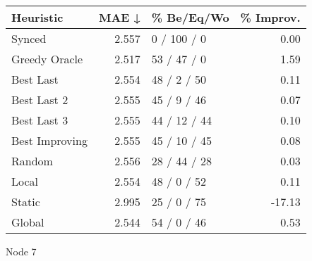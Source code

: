 \begin{tabular}{lrlr}
\toprule
\textbf{Heuristic} & \textbf{MAE ↓} & \textbf{\% Be/Eq/Wo} & \textbf{\% Improv.} \\
\midrule
            Synced &          2.557 &          0 / 100 / 0 &                0.00 \\
     Greedy Oracle &          2.517 &          53 / 47 / 0 &                1.59 \\
         Best Last &          2.554 &          48 / 2 / 50 &                0.11 \\
       Best Last 2 &          2.555 &          45 / 9 / 46 &                0.07 \\
       Best Last 3 &          2.555 &         44 / 12 / 44 &                0.10 \\
    Best Improving &          2.555 &         45 / 10 / 45 &                0.08 \\
            Random &          2.556 &         28 / 44 / 28 &                0.03 \\
             Local &          2.554 &          48 / 0 / 52 &                0.11 \\
            Static &          2.995 &          25 / 0 / 75 &              -17.13 \\
            Global &          2.544 &          54 / 0 / 46 &                0.53 \\
\bottomrule
\end{tabular}
\caption{Node 7}
\label{tab:hr_iid_lr01_le1_bs2_7}
